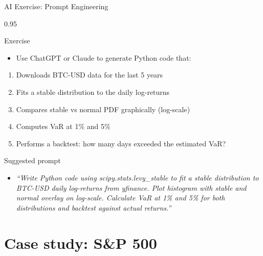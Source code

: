 \documentclass[9pt, aspectratio=169, t]{beamer}
\begin{document}
\begin{frame}{AI Exercise: Prompt Engineering}
    \begin{cminipage}{0.95\textwidth}
\begin{block}{Exercise}
\begin{itemize}\setlength{\itemsep}{0pt}
    \item Use ChatGPT or Claude to generate Python code that:
\end{itemize}
\end{block}

\begin{enumerate}\setlength{\itemsep}{0pt}
    \item Downloads BTC-USD data for the last 5 years
    \item Fits a stable distribution to the daily log-returns
    \item Compares stable vs normal PDF graphically (log-scale)
    \item Computes VaR at 1\% and 5\%
    \item Performs a backtest: how many days exceeded the estimated VaR?
\end{enumerate}

\vspace{0.3cm}
\begin{alertblock}{Suggested prompt}
\begin{itemize}\setlength{\itemsep}{0pt}
    \item \textit{``Write Python code using scipy.stats.levy\_stable to fit a stable distribution to BTC-USD daily log-returns from yfinance. Plot histogram with stable and normal overlay on log-scale. Calculate VaR at 1\% and 5\% for both distributions and backtest against actual returns.''}
\end{itemize}
\end{alertblock}
    \end{cminipage}
\end{frame}

\section{Case study: S\&P 500}
\end{document}
